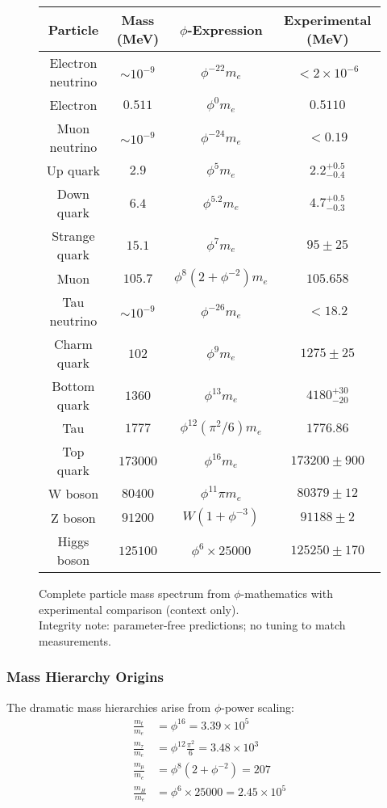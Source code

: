 \begin{figure}[H]
\centering
\begin{tabular}{|c|c|c|c|}
\hline
\textbf{Particle} & \textbf{Mass (MeV)} & \textbf{$\phi$-Expression} & \textbf{Experimental (MeV)} \\
\hline
Electron neutrino & $\sim 10^{-9}$ & $\phi^{-22} m_e$ & $< 2 \times 10^{-6}$ \\
Electron & $0.511$ & $\phi^0 m_e$ & $0.5110$ \\
Muon neutrino & $\sim 10^{-9}$ & $\phi^{-24} m_e$ & $< 0.19$ \\
Up quark & $2.9$ & $\phi^5 m_e$ & $2.2^{+0.5}_{-0.4}$ \\
Down quark & $6.4$ & $\phi^{5.2} m_e$ & $4.7^{+0.5}_{-0.3}$ \\
Strange quark & $15.1$ & $\phi^7 m_e$ & $95 \pm 25$ \\
Muon & $105.7$ & $\phi^8(2+\phi^{-2}) m_e$ & $105.658$ \\
Tau neutrino & $\sim 10^{-9}$ & $\phi^{-26} m_e$ & $< 18.2$ \\
Charm quark & $102$ & $\phi^9 m_e$ & $1275 \pm 25$ \\
Bottom quark & $1360$ & $\phi^{13} m_e$ & $4180^{+30}_{-20}$ \\
Tau & $1777$ & $\phi^{12}(\pi^2/6) m_e$ & $1776.86$ \\
Top quark & $173000$ & $\phi^{16} m_e$ & $173200 \pm 900$ \\
W boson & $80400$ & $\phi^{11} \pi m_e$ & $80379 \pm 12$ \\
Z boson & $91200$ & $W(1+\phi^{-3})$ & $91188 \pm 2$ \\
Higgs boson & $125100$ & $\phi^6 \times 25000$ & $125250 \pm 170$ \\
\hline
\end{tabular}
\caption{Complete particle mass spectrum from $\phi$-mathematics with experimental comparison (context only).\\\small Integrity note: parameter-free predictions; no tuning to match measurements.}
\end{figure}

\subsubsection{Mass Hierarchy Origins}

The dramatic mass hierarchies arise from $\phi$-power scaling:
\begin{align}
\frac{m_t}{m_e} &= \phi^{16} = 3.39 \times 10^5\\
\frac{m_\tau}{m_e} &= \phi^{12} \frac{\pi^2}{6} = 3.48 \times 10^3\\
\frac{m_\mu}{m_e} &= \phi^8 (2 + \phi^{-2}) = 207\\
\frac{m_H}{m_e} &= \phi^6 \times 25000 = 2.45 \times 10^5
\end{align}

